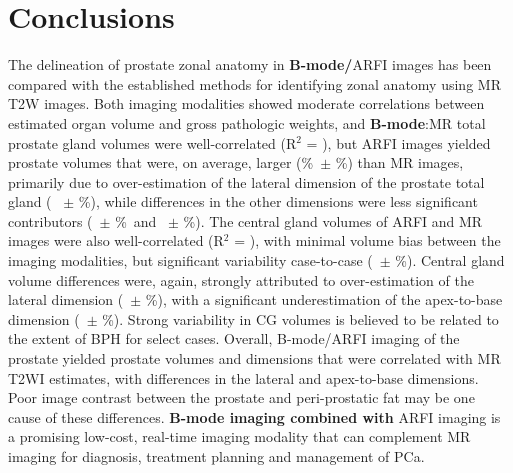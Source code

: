 \section{Conclusions}
The delineation of prostate zonal anatomy in \textbf{B-mode/}ARFI images has
been compared with the established methods for identifying zonal anatomy using
MR T2W images.  Both imaging modalities showed moderate correlations between
estimated organ volume and gross pathologic weights, and \textbf{B-mode}:MR
total prostate gland volumes were well-correlated (R$^2$ = \MRarfiVolTotalRsq),
but ARFI images yielded prostate volumes that were, on average, larger
(\MRarfiVolTotalMeanDiff\%~$\pm$ \MRarfiVolTotalStdDiff\%) than MR images,
primarily due to over-estimation of the lateral dimension of the prostate total
gland (\ARFImrTotalLatLatMeanPct~ $\pm$ \ARFImrTotalLatLatStdPct\%), while
differences in the other dimensions were less significant contributors
(\ARFImrTotalAntPostMeanPct~$\pm$ \ARFImrTotalAntPostStdPct\%~and
\ARFImrTotalApexBaseMeanPct~$\pm$ \ARFImrTotalApexBaseStdPct\%).  The central
gland volumes of ARFI and MR images were also well-correlated (R$^2$ =
\MRarfiVolCentralRsq), with minimal volume bias between the imaging modalities,
but significant variability case-to-case (\MRarfiVolCentralMeanDiff~$\pm$
\MRarfiVolCentralStdDiff\%).  Central gland volume differences were, again,
strongly attributed to over-estimation of the lateral dimension
(\ARFImrCentralLatLatMeanPct~$\pm$ \ARFImrCentralLatLatStdPct\%), with a
significant underestimation of the apex-to-base dimension
(\ARFImrCentralAntPostMeanPct~$\pm$ \ARFImrCentralAntPostStdPct\%).  Strong
variability in CG volumes is believed to be related to the extent of BPH for
select cases.  Overall, B-mode/ARFI imaging of the prostate yielded prostate
volumes and dimensions that were correlated with MR T2WI estimates, with
differences in the lateral and apex-to-base dimensions.  Poor image contrast
between the prostate and peri-prostatic fat may be one cause of these
differences.  \textbf{B-mode imaging combined with} ARFI imaging is a promising
low-cost, real-time imaging modality that can complement MR imaging for
diagnosis, treatment planning and management of PCa.
